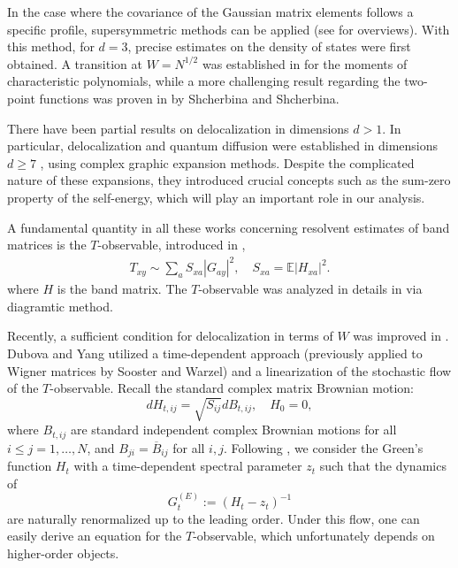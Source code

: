 \documentclass[10pt,reqno]{article}
\renewcommand{\bar}{\overline}
\theoremstyle{plain} %
\theoremstyle{remark}
\numberwithin{equation}{section}
\begin{document}
In the case where the covariance of the Gaussian matrix elements follows a specific profile, supersymmetric methods can be applied \cite{BaoErd2015, SchMT, Sch1, Sch2,Shcherbina:2021wz, DisPinSpe2002} (see \cite{Efe1997, Spe} for overviews). With this method, for $d=3$, precise estimates on the density of states \cite{DisPinSpe2002} were first obtained. A transition at \( W = N^{1/2} \) was established in \cite{SchMT,Sch1} for the moments of characteristic polynomials, while a more challenging result regarding the two-point functions was proven in \cite{Shcherbina:2021wz} by Shcherbina and  Shcherbina. 

There have been partial results on delocalization in dimensions \( d > 1 \). In particular, delocalization and quantum diffusion were established in dimensions \( d \geq 7 \) \cite{yang2021delocalization, yang2022delocalization, Xu:2024aa}, using complex graphic expansion methods. Despite the complicated nature of these expansions, they introduced crucial concepts such as the sum-zero property of the self-energy, which will play an important role in our analysis.




A fundamental  quantity in all these works concerning  resolvent estimates of band matrices is the \( T \)-observable, introduced in \cite{erdos2013delocalization},  
\begin{align}\label{T}
T_{xy} \sim \sum_{a} S_{xa} |G_{ay}|^2 , \quad S_{xa} = \mathbb{E} |H_{xa}|^2.
\end{align} 
where $H$ is the band matrix. The \( T \)-observable was analyzed in details in  \cite{yang2021delocalization, yang2022delocalization, Xu:2024aa} via diagramtic method. 


  



Recently, a sufficient condition for delocalization in terms of \( W \) was improved in \cite{DY}. Dubova and  Yang utilized a time-dependent approach (previously applied to Wigner matrices \cite{10.1214/19-ECP278, Sooster2019} by Sooster and Warzel) and a linearization of the stochastic flow of the \( T \)-observable. Recall the standard complex matrix Brownian motion:
\[
dH_{t,ij} = \sqrt{S_{ij}} dB_{t,ij}, \quad H_0 = 0,
\]
where \( B_{t,ij} \) are standard independent complex Brownian motions for all \( i \leq j = 1, \dots, N \), and \( B_{ji} = \bar{B}_{ij} \) for all \( i, j \). Following \cite{10.1214/19-ECP278, Sooster2019, DY}, we consider the Green’s function \( H_t \) with a time-dependent spectral parameter \( z_t \) such that the dynamics of
\[
G_{t}^{(E)} := (H_{t} - z_t)^{-1}
\]
are naturally renormalized up to the leading order. Under this flow, one can easily derive an equation for the \( T \)-observable, which unfortunately depends on higher-order objects.  
\end{document}
